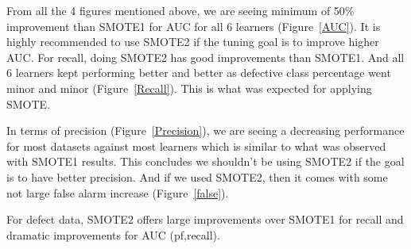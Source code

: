 From all the 4 figures mentioned above, we are seeing minimum of 50\% improvement than SMOTE1 for AUC for all 6 learners (Figure~\ref{AUC}). It is highly recommended to use SMOTE2 if the tuning goal is to improve higher AUC. For recall, doing SMOTE2 has good improvements than SMOTE1. And all 6 learners kept performing better and better as defective class percentage went minor and minor (Figure~\ref{Recall}). This is what was expected for applying SMOTE.

In terms of precision (Figure~\ref{Precision}), we are seeing a decreasing performance for most datasets against most learners which is similar to what was observed with SMOTE1 results. This concludes we shouldn't be using SMOTE2 if the goal is to have better precision. And if we used SMOTE2, then it comes with some not large false alarm increase (Figure~\ref{false}).

\begin{lesson}
    For defect data, SMOTE2  
 offers   large  improvements over SMOTE1 for recall
 and dramatic improvements for AUC (pf,recall).
\end{lesson}

